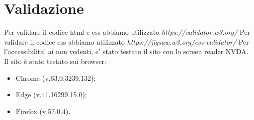 \section{Validazione}
Per validare il codice html e css abbiamo utilizzato \emph{https://validator.w3.org/} \newline
Per validare il codice css abbiamo utilizzato \emph{https://jigsaw.w3.org/css-validator/} \newline
Per l'accessibilita' ai non vedenti, e' stato testato il sito con lo screen reader NVDA.\newline
Il sito è stato testato sui browser:
\begin{itemize}
    \item Chrome (v.63.0.3239.132);
    \item Edge (v.41.16299.15.0);
    \item Firefox (v.57.0.4).	
\end{itemize}